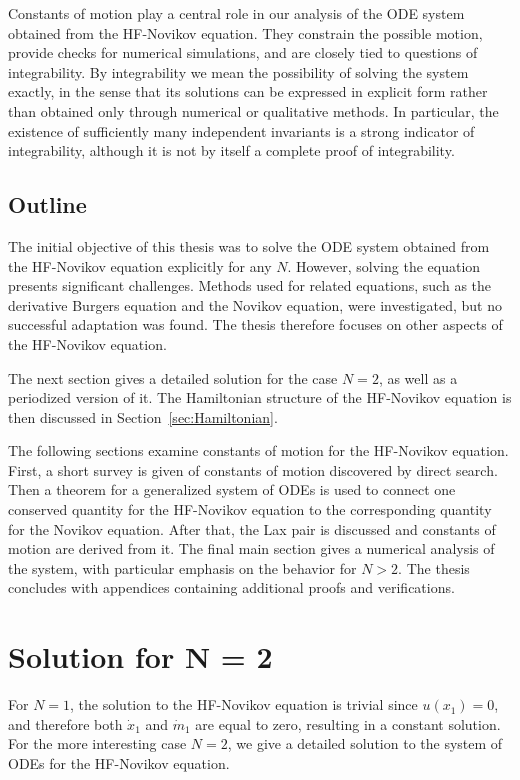 \documentclass[english,master]{liumaiex}
\theoremstyle{thesisplain}
\theoremstyle{thesisdefinition}
\numberwithin{equation}{section}
\begin{document}
Constants of motion play a central role in our analysis of the ODE system obtained from the HF-Novikov equation. They constrain the possible motion, provide checks for numerical simulations, and are closely tied to questions of integrability. By integrability we mean the possibility of solving the system exactly, in the sense that its solutions can be expressed in explicit form rather than obtained only through numerical or qualitative methods. In particular, the existence of sufficiently many independent invariants is a strong indicator of integrability, although it is not by itself a complete proof of integrability.

\subsection{Outline}

The initial objective of this thesis was to solve the ODE system obtained from the HF-Novikov equation explicitly for any $N$. However, solving the equation presents significant challenges. Methods used for related equations, such as the derivative Burgers equation and the Novikov equation, were investigated, but no successful adaptation was found. The thesis therefore focuses on other aspects of the HF-Novikov equation.

The next section gives a detailed solution for the case $N = 2$, as well as a periodized version of it. The Hamiltonian structure of the HF-Novikov equation is then discussed in Section~\ref{sec:Hamiltonian}.

The following sections examine constants of motion for the HF-Novikov equation. First, a short survey is given of constants of motion discovered by direct search. Then a theorem for a generalized system of ODEs is used to connect one conserved quantity for the HF-Novikov equation to the corresponding quantity for the Novikov equation. After that, the Lax pair is discussed and constants of motion are derived from it. The final main section gives a numerical analysis of the system, with particular emphasis on the behavior for $N > 2$. The thesis concludes with appendices containing additional proofs and verifications.

\section{Solution for N = 2}

For $N = 1$, the solution to the HF-Novikov equation is trivial since $u(x_1) = 0$, and therefore both $\dot{x}_1$ and $\dot{m}_1$ are equal to zero, resulting in a constant solution. For the more interesting case $N = 2$, we give a detailed solution to the system of ODEs for the HF-Novikov equation.
\end{document}
